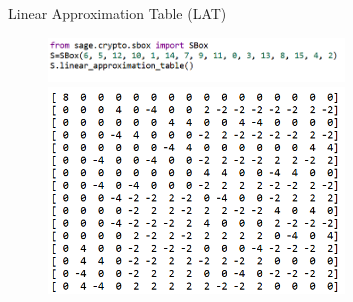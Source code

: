 \begin{frame}{Linear Approximation Table (LAT)}
\begin{block}{}
    \begin{figure}[H]
    \centering
    \includegraphics[width=0.7\textwidth]{Screenshot 2024-11-30 142114.png}
    \includegraphics[width=0.7\textwidth]{Screenshot 2024-11-30 142130.png}
\end{figure}
    
\end{block}
\end{frame}

